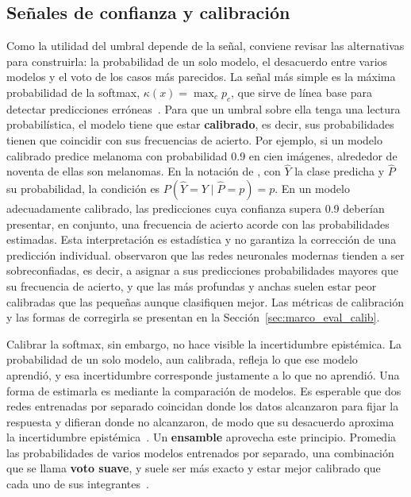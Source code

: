 \subsection{Señales de confianza y calibración}
\label{sec:marco_senales_confianza}

Como la utilidad del umbral depende de la señal, conviene revisar las alternativas para construirla: la
probabilidad de un solo modelo, el desacuerdo entre varios modelos y el voto de los casos más parecidos. La señal
más simple es la máxima probabilidad de la softmax, $\kappa(x) = \max_c p_c$, que sirve de línea base
para detectar predicciones erróneas~\cite{hendrycks2017baseline}. Para que un umbral sobre ella tenga una lectura
probabilística, el modelo tiene que estar \textbf{calibrado}, es decir, sus probabilidades tienen que coincidir
con sus frecuencias de acierto. Por ejemplo, si un modelo calibrado predice melanoma con probabilidad 0.9 en cien
imágenes, alrededor de noventa de ellas son melanomas. En la notación de \textcite{guo2017calibration}, con
$\hat{Y}$ la clase predicha y $\hat{P}$ su probabilidad, la condición es $P(\hat{Y} = Y \mid \hat{P} = p) = p$.
En un modelo adecuadamente calibrado, las predicciones cuya confianza supera 0.9 deberían presentar, en conjunto, una frecuencia de acierto acorde con las probabilidades estimadas. Esta interpretación es estadística y no garantiza la corrección de una predicción individual. \textcite{guo2017calibration} observaron que las
redes neuronales modernas tienden a ser sobreconfiadas, es decir, a asignar a sus predicciones probabilidades
mayores que su frecuencia de acierto, y que las más profundas y anchas suelen estar peor calibradas que las
pequeñas aunque clasifiquen mejor. Las métricas de calibración y las formas de corregirla se presentan en la
Sección~\ref{sec:marco_eval_calib}.

Calibrar la softmax, sin embargo, no hace visible la incertidumbre epistémica. La probabilidad de un solo
modelo, aun calibrada, refleja lo que ese modelo aprendió, y esa incertidumbre corresponde justamente a lo que no
aprendió. Una forma de estimarla es mediante la comparación de modelos. Es esperable
que dos redes entrenadas por separado coincidan donde los datos alcanzaron para fijar la respuesta y difieran
donde no alcanzaron, de modo que su desacuerdo aproxima la incertidumbre epistémica~\cite{kendall2017uncertainties}.
Un \textbf{ensamble} aprovecha este principio. Promedia las probabilidades de varios modelos entrenados por
separado, una combinación que se llama \textbf{voto suave}, y suele ser más exacto y estar mejor calibrado que
cada uno de sus integrantes~\cite{lakshminarayanan2017simple}.

